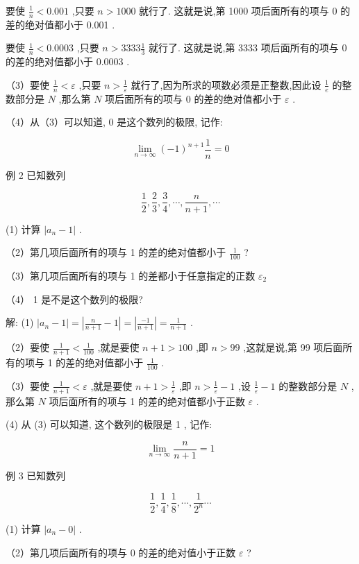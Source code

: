 \documentclass[lang=cn,newtx,10pt,scheme=chinese]{elegantbook}
\begin{document}
要使 \(\frac{1}{n} < {0.001}\) ,只要 \(n > {1000}\) 就行了. 这就是说,第 1000 项后面所有的项与 0 的差的绝对值都小于 0.001 .

要使 \(\frac{1}{n} < {0.0003}\) ,只要 \(n > {3333}\frac{1}{3}\) 就行了. 这就是说,第 3333 项后面所有的项与 0 的差的绝对值都小于 0.0003 .

（3）要使 \(\frac{1}{n} < \varepsilon\) ,只要 \(n > \frac{1}{\varepsilon }\) 就行了,因为所求的项数必须是正整数,因此设 \(\frac{1}{e}\) 的整数部分是 \(N\) ,那么第 \(N\) 项后面所有的项与 0 的差的绝对值都小于 \(\varepsilon\) .

（4）从（3）可以知道, 0 是这个数列的极限, 记作:

\[
\mathop{\lim }\limits_{{n \rightarrow \infty }}{\left( -1\right) }^{n + 1}\frac{1}{n} = 0
\]

例 2 已知数列

\[
\frac{1}{2},\frac{2}{3},\frac{3}{4},\cdots ,\frac{n}{n + 1},\cdots
\]

(1) 计算 \(\left| {{a}_{n} - 1}\right|\) .

（2）第几项后面所有的项与 1 的差的绝对值都小于 \(\frac{1}{100}\) ?

（3）第几项后面所有的项与 1 的差都小于任意指定的正数 \({\varepsilon }_{2}\)

（4） 1 是不是这个数列的极限?

解: (1) \(\left| {{a}_{n} - 1}\right| = \left| {\frac{n}{n + 1} - 1}\right| = \left| \frac{-1}{n + 1}\right| = \frac{1}{n + 1}\) .

（2）要使 \(\frac{1}{n + 1} < \frac{1}{100}\) ,就是要使 \(n + 1 > {100}\) ,即 \(n > {99}\) ,这就是说,第 99 项后面所有的项与 1 的差的绝对值都小于 \(\frac{1}{100}\) .

（3）要使 \(\frac{1}{n + 1} < \varepsilon\) ,就是要使 \(n + 1 > \frac{1}{\varepsilon }\) ,即 \(n > \frac{1}{\varepsilon } - 1\) ,设 \(\frac{1}{\varepsilon } - 1\) 的整数部分是 \(N\) ,那么第 \(N\) 项后面所有的项与 1 的差的绝对值都小于正数 \(\varepsilon\) .

(4) 从 (3) 可以知道, 这个数列的极限是 1 , 记作:

\[
\mathop{\lim }\limits_{{n \rightarrow \infty }}\frac{n}{n + 1} = 1
\]

例 3 已知数列

\[
\frac{1}{2},\frac{1}{4},\frac{1}{8},\cdots ,\frac{1}{{2}^{n}}\cdots
\]

(1) 计算 \(\left| {{a}_{n} - 0}\right|\) .

（2）第几项后面所有的项与 0 的差的绝对值小于正数 \(\varepsilon\) ?
\end{document}
